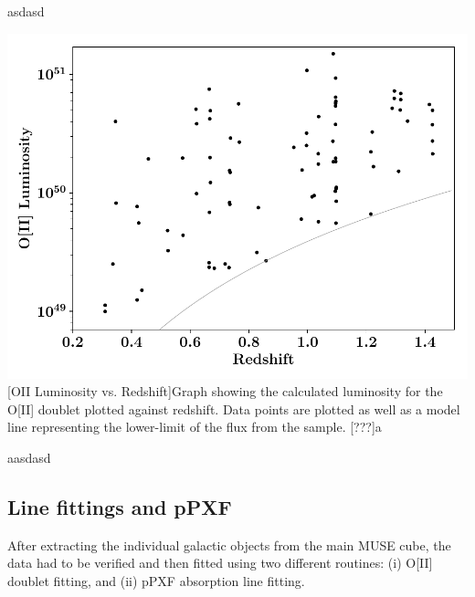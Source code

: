 \documentclass[12pt, twocolumn]{revtex4}    %
\begin{document}
\twocolumngrid

asdasd

\begin{center}
\includegraphics[width=1.0\linewidth]{data/o_ii_luminosity_vs_redshift}
[OII Luminosity vs. Redshift]{Graph showing the calculated luminosity for the O[II] doublet plotted against redshift. Data points are plotted as well as a model line representing the lower-limit of the flux from the sample. [???]a}
\label{fig:oiiluminosity_redshift}
\end{center}

aasdasd

\subsection{Line fittings and pPXF} 

After extracting the individual galactic objects from the main MUSE cube, the data had to be verified and then fitted using two different routines: (i) O[II] doublet fitting, and (ii) pPXF absorption line fitting. 
\end{document}
